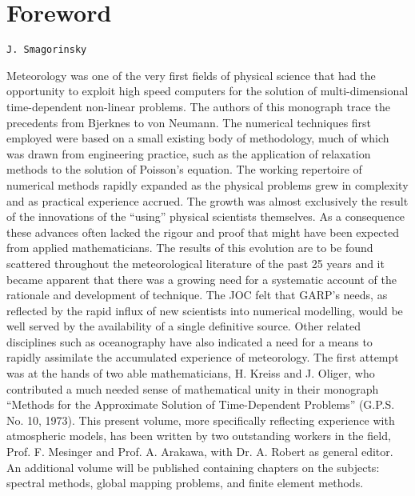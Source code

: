 \section{Foreword}\label{foreword}

\texttt{J.\ Smagorinsky}

Meteorology was one of the very first fields of physical science that
had the opportunity to exploit high speed computers for the solution of
multi-dimensional time-dependent non-linear problems. The authors of
this monograph trace the precedents from Bjerknes to von Neumann. The
numerical techniques first employed were based on a small existing body
of methodology, much of which was drawn from engineering practice, such
as the application of relaxation methods to the solution of
Poisson's equation. The working repertoire of numerical
methods rapidly expanded as the physical problems grew in complexity and
as practical experience accrued. The growth was almost exclusively the
result of the innovations of the ``using'' physical scientists themselves.
As a consequence these advances often lacked the rigour and proof that
might have been expected from applied mathematicians. The results of
this evolution are to be found scattered throughout the meteorological
literature of the past 25 years and it became apparent that there was a
growing need for a systematic account of the rationale and development
of technique. The JOC felt that GARP's needs, as
reflected by the rapid influx of new scientists into numerical
modelling, would be well served by the availability of a single
definitive source. Other related disciplines such as oceanography have
also indicated a need for a means to rapidly assimilate the accumulated
experience of meteorology. The first attempt was at the hands of two
able mathematicians, H. Kreiss and J. Oliger, who contributed a much
needed sense of mathematical unity in their monograph ``Methods for the
Approximate Solution of Time-Dependent Problems'' (G.P.S. No. 10, 1973).
This present volume, more specifically reflecting experience with
atmospheric models, has been written by two outstanding workers in the
field, Prof. F. Mesinger and Prof. A. Arakawa, with Dr. A. Robert as
general editor. An additional volume will be published containing
chapters on the subjects: spectral methods, global mapping problems, and
finite element methods.
